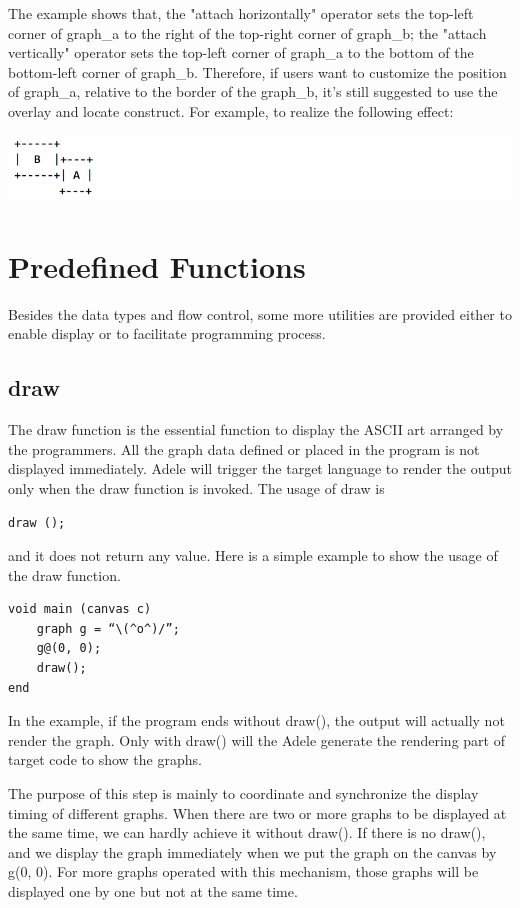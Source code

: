 \documentclass[11pt,letterpaper]{article}
\begin{document}
The example shows that, the "attach horizontally" operator sets the top-left corner of graph\_a to the right of the top-right corner of graph\_b; the "attach vertically" operator sets the top-left corner of graph\_a to the bottom of the bottom-left corner of graph\_b. Therefore, if users want to customize the position of graph\_a, relative to the border of the graph\_b, it's still suggested to use the overlay and locate construct. For example, to realize the following effect:

\includegraphics[width=\textwidth]{./graph_03.png}

\section {Predefined Functions}

Besides the data types and flow control, some more utilities are provided either to enable display or to facilitate programming process.

\subsection {draw}
The draw function is the essential function to display the ASCII art arranged by the programmers. All the graph data defined or placed in the program is not displayed immediately. Adele will trigger the target language to render the output only when the draw function is invoked. The usage of draw is
\begin{lstlisting}[tabsize=4] 
	draw (); 
\end{lstlisting}
and it does not return any value. Here is a simple example to show the usage of the draw function.

\begin{lstlisting}[tabsize=4, frame=single]
void main (canvas c)
	graph g = “\(^o^)/”;
	g@(0, 0);
	draw();
end
\end{lstlisting}

In the example, if the program ends without draw(), the output will actually not render the graph. Only with draw() will the Adele generate the rendering part of target code to show the graphs.

The purpose of this step is mainly to coordinate and synchronize the display timing of different graphs. When there are two or more graphs to be displayed at the same time, we can hardly achieve it without draw(). If there is no draw(), and we display the graph immediately when we put the graph on the canvas by g\@(0, 0). For more graphs operated with this mechanism, those graphs will be displayed one by one but not at the same time.
\end{document}
